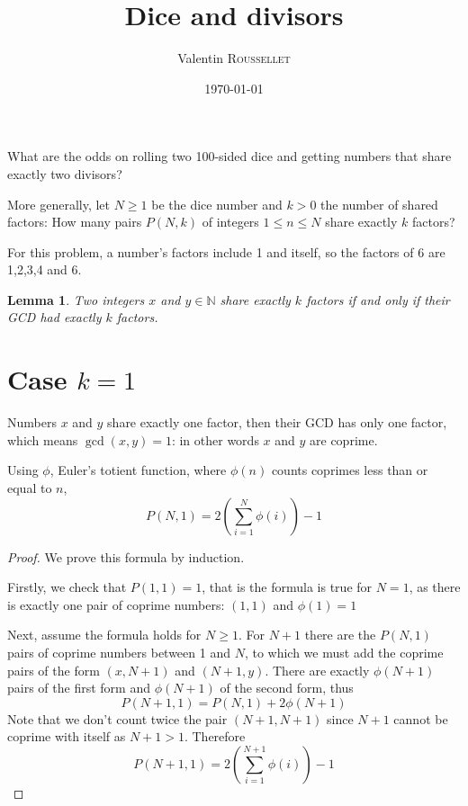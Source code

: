 \documentclass[a4paper, 10pt]{article}
\title{Dice and divisors}
\author{Valentin \textsc{Roussellet}}
\date{\today}
\numberwithin{equation}{section} %
\begin{document}
\maketitle
What are the odds on rolling two 100-sided dice and getting numbers that share exactly two divisors?

More generally, let $N \geq 1$ be the dice number and $k > 0$ the number of shared factors:
How many pairs $P(N,k)$ of integers $ 1 \leq n \leq N$ share exactly $k$ factors?


For this problem, a number's factors include 1 and itself, so the factors of 6 are 1,2,3,4 and 6.
\newtheorem{lemma}{Lemma}
\begin{lemma}
    Two integers $x$ and $y \in \mathbb{N}$ share exactly $k$ factors if and only if their GCD
    had exactly $k$ factors.
    \label{thm:div}
\end{lemma}

\section*{Case $k = 1$}
Numbers $x$ and $y$ share exactly one factor, then their GCD has only one factor, which means $\gcd(x,y) =1$: in other words $x$ and $y$ are coprime.

Using $\phi$, Euler's totient function, where $\phi(n)$ counts coprimes less than or equal to $n$,
\[
    P(N,1) = 2 \left( \sum_{i=1}^N \phi(i)  \right)- 1
\]
\begin{proof}
    We prove this formula by induction.

    Firstly, we check that $P(1,1) = 1$, that is the formula is true for $N = 1$, as there is exactly one pair of coprime numbers: $(1,1)$ and
    $\phi(1) = 1$

    Next, assume the formula holds for $N \geq 1$.
    For $N+1$ there are the $P(N,1)$ pairs of coprime numbers between 1 and $N$, to which
    we must add the coprime pairs of the form $(x,N+1)$ and $(N+1,y)$.
    There are exactly $\phi(N+1)$ pairs of the first form and $\phi(N+1)$ of the second form,
    thus
    \[ P(N+1,1) = P(N,1) + 2 \phi(N+1) \]
    Note that we don't count twice the pair $(N+1, N+1)$ since $N+1$ cannot be coprime with itself as $N+1 > 1$.
    Therefore
    \[
        P(N+1,1) = 2 \left( \sum_{i=1}^{N+1} \phi(i)  \right) - 1
    \]

\end{proof}
\end{document}

